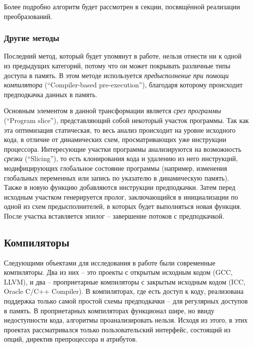\documentclass[12pt,a4paper,oneside]{article}
\begin{document}
Более подробно алгоритм будет рассмотрен в секции, посвящённой реализации преобразований.

\subsubsection{Другие методы}

\indent

Последний метод, который будет упомянут в работе, нельзя отнести ни к одной из предыдущих категорий, потому что он может покрывать различные типы доступа в память. В этом методе используется \emph{предысполнение при помощи компилятора} (``Compiler-based pre-execution'')\cite{Kim}, благодаря которому происходит предподкачка данных в память.

Основным элементом в данной трансформации является \emph{срез программы} (``Program slice''), представляющий собой некоторый участок программы. Так как эта оптимизация статическая, то весь анализ происходит на уровне исходного кода, в отличие от динамических схем, просматривающих уже инструкции процессора. Интересующие участки программы анализируются на возможность \emph{срезки} (``Slicing''), то есть клонирования кода и удалению из него инструкций, модифицирующих глобальное состояние программы (например, изменения глобальных переменных или запись по указателю в динамическую память). Также в новую функцию добавляются инструкции предподкачки. Затем перед исходным участком генерируется пролог, заключающийся в инициализации по одной из схем предысполнителей, в которых будет выполняться новая функция. После участка вставляется эпилог -- завершение потоков с предподкачкой.

\subsection{Компиляторы}

\indent

Следующими объектами для исследования в работе были современные компиляторы. Два из них -- это проекты с открытым исходным кодом (GCC, LLVM), и два -- проприетарные компиляторы с закрытым исходным кодом (ICC, Oracle C/C++ Compiler). В компиляторах, где есть доступ к коду, реализована поддержка только самой простой схемы предподкачки -- для регулярных доступов в память. В проприетарных компиляторах функционал шире, но ввиду недоступности кода, алгоритмы проанализировать нельзя. Исходя из этого, в этих проектах рассматривался только пользовательский интерфейс, состоящий из опций, директив препроцессора и атрибутов.
\end{document}
